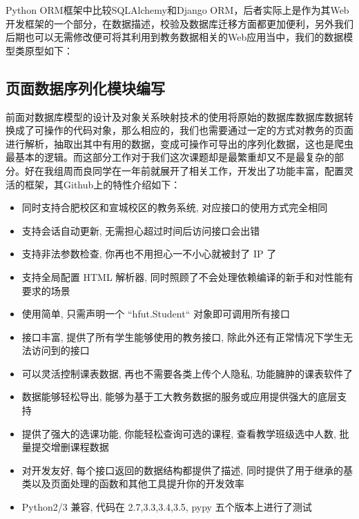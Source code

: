 \documentclass[UTF8, zihao=-4, heading=false]{ctexart}
\begin{document}
    Python ORM框架中比较SQLAlchemy和Django ORM，后者实际上是作为其Web开发框架的一个部分，在数据描述，校验及数据库迁移方面都更加便利，另外我们后期也可以无需修改便可将其利用到教务数据相关的Web应用当中，我们的数据模型类原型如下：
    
    
    
    \subsection{页面数据序列化模块编写}
    前面对数据库模型的设计及对象关系映射技术的使用将原始的数据库数据库数据转换成了可操作的代码对象，那么相应的，我们也需要通过一定的方式对教务的页面进行解析，抽取出其中有用的数据，变成可操作可导出的序列化数据，这也是爬虫最基本的逻辑。而这部分工作对于我们这次课题却是最繁重却又不是最复杂的部分。好在我组周而良同学在一年前就展开了相关工作，开发出了功能丰富，配置灵活的框架，其Github上的特性介绍\cite{er1iang/hfut}如下：
    
    \begin{itemize}
        \item 同时支持合肥校区和宣城校区的教务系统, 对应接口的使用方式完全相同
        \item 支持会话自动更新, 无需担心超过时间后访问接口会出错
        \item 支持非法参数检查, 你再也不用担心一不小心就被封了 IP 了
        \item 支持全局配置 HTML 解析器, 同时照顾了不会处理依赖编译的新手和对性能有要求的场景
        \item 使用简单, 只需声明一个  ``hfut.Student``  对象即可调用所有接口
        \item 接口丰富, 提供了所有学生能够使用的教务接口, 除此外还有正常情况下学生无法访问到的接口
        \item 可以灵活控制课表数据, 再也不需要各类上传个人隐私, 功能臃肿的课表软件了
        \item 数据能够轻松导出, 能够为基于工大教务数据的服务或应用提供强大的底层支持
        \item 提供了强大的选课功能, 你能轻松查询可选的课程, 查看教学班级选中人数, 批量提交增删课程数据
        \item 对开发友好, 每个接口返回的数据结构都提供了描述, 同时提供了用于继承的基类以及页面处理的函数和其他工具提升你的开发效率
        \item Python2/3 兼容, 代码在 2.7,3.3,3.4,3.5, pypy 五个版本上进行了测试
    \end{itemize}
    
\end{document}
